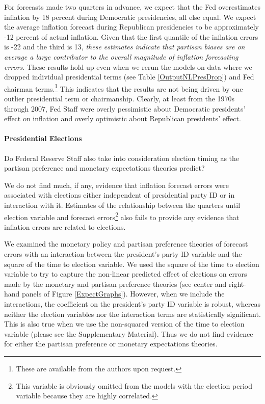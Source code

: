 \documentclass[a4paper]{article}
\begin{document}
For forecasts made two quarters in advance, we expect that the Fed overestimates inflation by 18 percent during Democratic presidencies, all else equal. We expect the average inflation forecast during Republican presidencies to be approximately -12 percent of actual inflation. Given that the first quantile of the inflation errors is -22 and the third is 13, \emph{these estimates indicate that partisan biases are on average a large contributor to the overall magnitude of inflation forecasting errors}. These results hold up even when we rerun the models on data where we dropped individual presidential terms (see Table \ref{OutputNLPresDrop}) and Fed chairman terms.\footnote{These are available from the authors upon request.} This indicates that the results are not being driven by one outlier presidential term or chairmanship. Clearly, at least from the 1970s through 2007, Fed Staff were overly pessimistic about Democratic presidents' effect on inflation and overly optimistic about Republican presidents' effect.

\paragraph{Presidential Elections}

Do Federal Reserve Staff also take into consideration election timing as the partisan preference and monetary expectations theories predict?

We do not find much, if any, evidence that inflation forecast errors were associated with elections either independent of presidential party ID or in interaction with it. Estimates of the relationship between the quarters until election variable and forecast errors\footnote{This variable is obviously omitted from the models with the election period variable because they are highly correlated.} also fails to provide any evidence that inflation errors are related to elections.

We examined the monetary policy and partisan preference theories of forecast errors with an interaction between the president's party ID variable and the square of the time to election variable. We used the square of the time to election variable to try to capture the non-linear predicted effect of elections on errors made by the monetary and partisan preference theories (see center and right-hand panels of Figure \ref{ExpectGraphs}). However, when we include the interactions, the coefficient on the president's party ID variable is robust, whereas neither the election variables nor the interaction terms are statistically significant. This is also true when we use the non-squared version of the time to election variable (please see the Supplementary Material). Thus we do not find evidence for either the partisan preference or monetary expectations theories.
\end{document}
